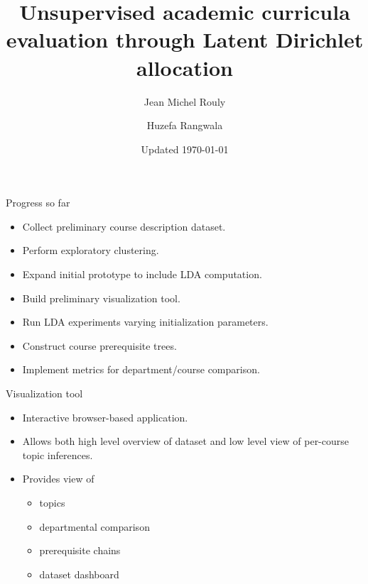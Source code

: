 \documentclass{beamer}
\title[Curricula and LDA]{Unsupervised academic curricula evaluation
  through Latent Dirichlet allocation}
\author{Jean Michel Rouly \and Huzefa Rangwala}
\date{Updated \today}
\begin{document}
  \frame{\titlepage}

  

  

  

%  

  \begin{frame}{Progress so far}
    \begin{itemize}
      \item Collect preliminary course description dataset.
      \item Perform exploratory clustering.
      \item Expand initial prototype to include LDA computation.
      \item Build preliminary visualization tool.
      \item Run LDA experiments varying initialization parameters.
      \item Construct course prerequisite trees.
      \item Implement metrics for department/course comparison.
    \end{itemize}
  \end{frame}

  

  

%  

  \begin{frame}{Visualization tool}

    \begin{itemize}
      \item Interactive browser-based application.
      \item Allows both high level overview of dataset and low level view of per-course topic inferences.
      \item Provides view of
        \begin{itemize}
          \item topics
          \item departmental comparison
          \item prerequisite chains
          \item dataset dashboard
        \end{itemize}
    \end{itemize}
  \end{frame}
\end{document}
